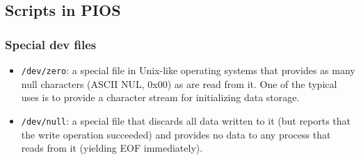 \subsection{Scripts in PIOS}
\subsubsection{Special dev files}
\begin{itemize}
\item \verb|/dev/zero|: a special file in Unix-like operating systems that provides as many null characters (ASCII NUL, 0x00) as are read from it. One of the typical uses is to provide a character stream for initializing data storage.
\item \verb|/dev/null|: a special file that discards all data written to it (but reports that the write operation succeeded) and provides no data to any process that reads from it (yielding EOF immediately).
\end{itemize}
